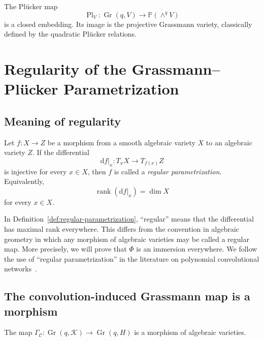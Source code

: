 \documentclass{siamonline250211}
\newcommand{\PP}{\mathbb P}
\newcommand{\Gr}{\operatorname{Gr}}
\newcommand{\Pl}{\operatorname{Pl}}
\newcommand{\rank}{\operatorname{rank}}
\newcommand{\cK}{\mathcal K}
\newcommand{\cC}{\mathcal C}
\newcommand{\dd}{\mathrm d}
\begin{document}
\begin{theorem}
\label{thm:Plucker-closed}
The Pl\"ucker map
\[
  \Pl_V:\Gr(q,V)\longrightarrow\PP(\wedge^qV)
\]
is a closed embedding. Its image is the projective Grassmann variety, classically
defined by the quadratic Pl\"ucker relations.
\end{theorem}

\section{Regularity of the Grassmann--Pl\texorpdfstring{\"u}{u}cker Parametrization}

\subsection{Meaning of regularity}

\begin{definition}
\label{def:regular-parametrization}
Let $f:X\to Z$ be a morphism from a smooth algebraic variety $X$ to an
algebraic variety $Z$. If the differential
\[
  \dd f|_x:T_xX\longrightarrow T_{f(x)}Z
\]
is injective for every $x\in X$, then $f$ is called a \emph{regular
parametrization}. Equivalently,
\[
  \rank(\dd f|_x)=\dim X
\]
for every $x\in X$.
\end{definition}

\begin{remark}
In Definition~\ref{def:regular-parametrization}, ``regular'' means that the
differential has maximal rank everywhere. This differs from the convention in
algebraic geometry in which any morphism of algebraic varieties may be called a
regular map. More precisely, we will prove that $\Phi$ is an immersion
everywhere. We follow the use of ``regular parametrization'' in the literature on
polynomial convolutional networks~\cite[Theorem~4.5]{SMK25}.
\end{remark}

\subsection{The convolution-induced Grassmann map is a morphism}

\begin{proposition}\label{prop:Gamma-morphism}
The map $\Gamma_{\cC}:\Gr(q,\cK)\to\Gr(q,H)$ is a morphism of algebraic
varieties.
\end{proposition}
\end{document}
